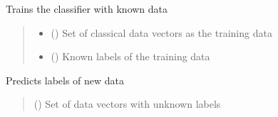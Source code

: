 \documentclass[letterpaper,10pt,english]{sphinxmanual}
\begin{document}
\begin{fulllineitems}
\begin{quote}
\begin{description}
\begin{itemize}
\end{itemize}

\end{description}\end{quote}

\begin{fulllineitems}
\label{\detokenize{qcompute_qapp.algorithm:qcompute_qapp.algorithm.KernelClassifier.fit}}
\pysigstartsignatures
{}
\pysigstopsignatures
\sphinxAtStartPar
Trains the classifier with known data
\begin{quote}\begin{description}
\begin{itemize}
\item {} 
\sphinxAtStartPar
{} () \textendash{} Set of classical data vectors as the training data

\item {} 
\sphinxAtStartPar
{} () \textendash{} Known labels of the training data

\end{itemize}

\end{description}\end{quote}

\end{fulllineitems}


\begin{fulllineitems}
\label{\detokenize{qcompute_qapp.algorithm:qcompute_qapp.algorithm.KernelClassifier.predict}}
\pysigstartsignatures
{}
\pysigstopsignatures
\sphinxAtStartPar
Predicts labels of new data
\begin{quote}\begin{description}
\sphinxAtStartPar
{} () \textendash{} Set of data vectors with unknown labels


\end{description}
\end{quote}
\end{fulllineitems}
\end{fulllineitems}
\end{document}
